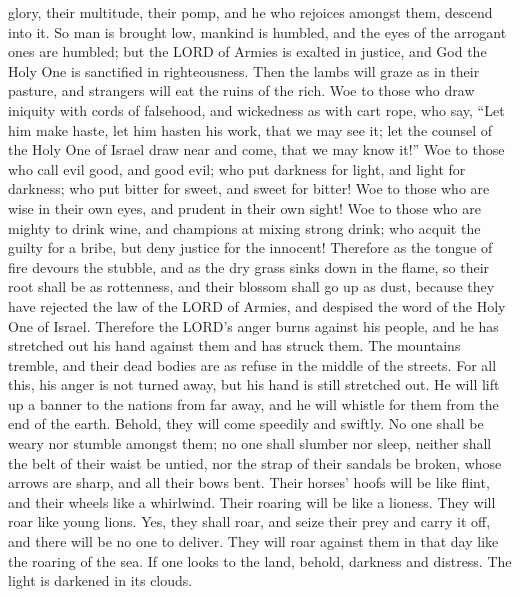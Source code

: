 glory, their multitude, their pomp, and he who rejoices amongst them,
descend into it.  So man is brought low, mankind is
humbled, and the eyes of the arrogant ones are humbled; 
but the LORD of Armies is exalted in justice, and God the Holy One is
sanctified in righteousness.  Then the lambs will graze
as in their pasture, and strangers will eat the ruins of the rich.
 Woe to those who draw iniquity with cords of falsehood,
and wickedness as with cart rope,  who say, ``Let him
make haste, let him hasten his work, that we may see it; let the counsel
of the Holy One of Israel draw near and come, that we may know it!''
 Woe to those who call evil good, and good evil; who put
darkness for light, and light for darkness; who put bitter for sweet,
and sweet for bitter!  Woe to those who are wise in their
own eyes, and prudent in their own sight!  Woe to those
who are mighty to drink wine, and champions at mixing strong drink;
 who acquit the guilty for a bribe, but deny justice for
the innocent!  Therefore as the tongue of fire devours
the stubble, and as the dry grass sinks down in the flame, so their root
shall be as rottenness, and their blossom shall go up as dust, because
they have rejected the law of the LORD of Armies, and despised the word
of the Holy One of Israel.  Therefore the LORD's anger
burns against his people, and he has stretched out his hand against them
and has struck them. The mountains tremble, and their dead bodies are as
refuse in the middle of the streets. For all this, his anger is not
turned away, but his hand is still stretched out.  He
will lift up a banner to the nations from far away, and he will whistle
for them from the end of the earth. Behold, they will come speedily and
swiftly.  No one shall be weary nor stumble amongst them;
no one shall slumber nor sleep, neither shall the belt of their waist be
untied, nor the strap of their sandals be broken,  whose
arrows are sharp, and all their bows bent. Their horses' hoofs will be
like flint, and their wheels like a whirlwind.  Their
roaring will be like a lioness. They will roar like young lions. Yes,
they shall roar, and seize their prey and carry it off, and there will
be no one to deliver.  They will roar against them in
that day like the roaring of the sea. If one looks to the land, behold,
darkness and distress. The light is darkened in its clouds.


